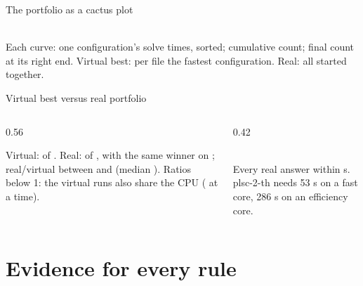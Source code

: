 \documentclass[aspectratio=169]{beamer}
\begin{document}
\begin{frame}{The portfolio as a cactus plot}
  \centering
  \begin{tikzpicture}
    
  \end{tikzpicture}\\
  \footnotesize Each curve: one configuration's solve times, sorted; cumulative count; final count at
  its right end. Virtual best: per file the fastest configuration. Real: all \pfNumConfigs{}
  started together.
\end{frame}

\begin{frame}{Virtual best versus real portfolio}
  \begin{columns}[T]
  \begin{column}{0.56\textwidth}
    \tiny\setlength{\tabcolsep}{3pt}
    
    \medskip

    \scriptsize Virtual: \pfVirtual{} of \pfTotal{}. Real: \pfReal{} of \pfTotal{}, with the same winner on
    \pfSame{}; real/virtual between \pfRatioMin{} and \pfRatioMax{} (median \pfRatioMed). Ratios
    below 1: the virtual runs also share the CPU (\pfJobs{} at a time).
  \end{column}
  \begin{column}{0.42\textwidth}
    \centering
    \begin{tikzpicture}
      
    \end{tikzpicture}\\
    \scriptsize Every real answer within \pfMaxReal{} s. plsc-2-th needs 53 s on a fast
    core, 286 s on an efficiency core.
  \end{column}
  \end{columns}
\end{frame}

\section{Evidence for every rule}
\end{document}
